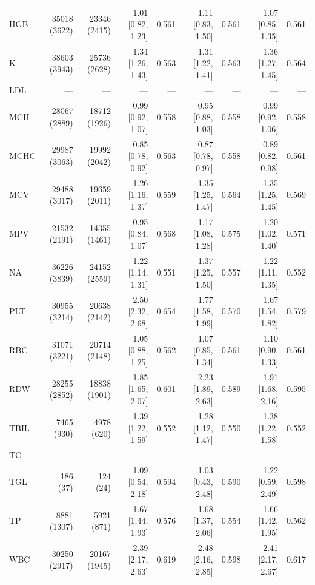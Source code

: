 \begin{table}[ht]
\begin{tabular}{lrrrrrrrr}
HGB & 35018 (3622) & 23346 (2415) & 1.01 [0.82, 1.23] & 0.561 & 1.11 [0.83, 1.50] & 0.561 & 1.07 [0.85, 1.35] & 0.561 \\
K & 38603 (3943) & 25736 (2628) & 1.34 [1.26, 1.43] & 0.563 & 1.31 [1.22, 1.41] & 0.563 & 1.36 [1.27, 1.45] & 0.564 \\
LDL & --- & --- & --- & --- & --- & --- & --- & --- \\
MCH & 28067 (2889) & 18712 (1926) & 0.99 [0.92, 1.07] & 0.558 & 0.95 [0.88, 1.03] & 0.558 & 0.99 [0.92, 1.06] & 0.558 \\
MCHC & 29987 (3063) & 19992 (2042) & 0.85 [0.78, 0.92] & 0.563 & 0.87 [0.78, 0.97] & 0.558 & 0.89 [0.82, 0.98] & 0.561 \\
MCV & 29488 (3017) & 19659 (2011) & 1.26 [1.16, 1.37] & 0.559 & 1.35 [1.25, 1.47] & 0.564 & 1.35 [1.25, 1.45] & 0.569 \\
MPV & 21532 (2191) & 14355 (1461) & 0.95 [0.84, 1.07] & 0.568 & 1.17 [1.08, 1.28] & 0.575 & 1.20 [1.02, 1.40] & 0.571 \\
NA & 36226 (3839) & 24152 (2559) & 1.22 [1.14, 1.31] & 0.551 & 1.37 [1.25, 1.50] & 0.557 & 1.22 [1.11, 1.35] & 0.552 \\
PLT & 30955 (3214) & 20638 (2142) & 2.50 [2.32, 2.68] & 0.654 & 1.77 [1.58, 1.99] & 0.570 & 1.67 [1.54, 1.82] & 0.579 \\
RBC & 31071 (3221) & 20714 (2148) & 1.05 [0.88, 1.25] & 0.562 & 1.07 [0.85, 1.34] & 0.561 & 1.10 [0.90, 1.33] & 0.561 \\
RDW & 28255 (2852) & 18838 (1901) & 1.85 [1.65, 2.07] & 0.601 & 2.23 [1.89, 2.63] & 0.589 & 1.91 [1.68, 2.16] & 0.595 \\
TBIL & 7465 (930) & 4978 (620) & 1.39 [1.22, 1.59] & 0.552 & 1.28 [1.12, 1.47] & 0.550 & 1.38 [1.22, 1.58] & 0.552 \\
TC & --- & --- & --- & --- & --- & --- & --- & --- \\
TGL & 186 (37) & 124 (24) & 1.09 [0.54, 2.18] & 0.594 & 1.03 [0.43, 2.48] & 0.590 & 1.22 [0.59, 2.49] & 0.598 \\
TP & 8881 (1307) & 5921 (871) & 1.67 [1.44, 1.93] & 0.576 & 1.68 [1.37, 2.06] & 0.554 & 1.66 [1.42, 1.95] & 0.562 \\
WBC & 30250 (2917) & 20167 (1945) & 2.39 [2.17, 2.63] & 0.619 & 2.48 [2.16, 2.85] & 0.598 & 2.41 [2.17, 2.67] & 0.617 \\
\bottomrule
\end{tabular}
\label{tab:eicu_cox_mortality}
\end{table}